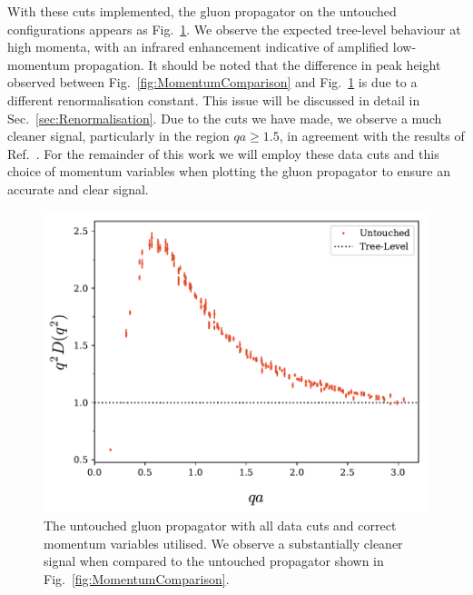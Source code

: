 With these cuts implemented, the gluon propagator on the untouched configurations appears as Fig.~\ref{fig:UntouchedPropagator}. We observe the expected tree-level behaviour at high momenta, with an infrared enhancement indicative of amplified low-momentum propagation. It should be noted that the difference in peak height observed between Fig.~\ref{fig:MomentumComparison} and Fig.~\ref{fig:UntouchedPropagator} is due to a different renormalisation constant. This issue will be discussed in detail in Sec.~\ref{sec:Renormalisation}. Due to the cuts we have made, we observe a much cleaner signal, particularly in the region $qa\geq 1.5$, in agreement with the results of Ref.~\cite{Bonnet:2001uh}. For the remainder of this work we will employ these data cuts and this choice of momentum variables when plotting the gluon propagator to ensure an accurate and clear signal.
%
\begin{figure}[htb!]
\centering
\includegraphics[width=\linewidth]{./ScalarGluComp_q2_NoCoolU.pdf}
\caption[The untouched gluon propagator with all data cuts and correct momentum variables utilised.]{\label{fig:UntouchedPropagator} The untouched gluon propagator with all data cuts and correct momentum variables utilised. We observe a substantially cleaner signal when compared to the untouched propagator shown in Fig.~\ref{fig:MomentumComparison}.}
\end{figure}


